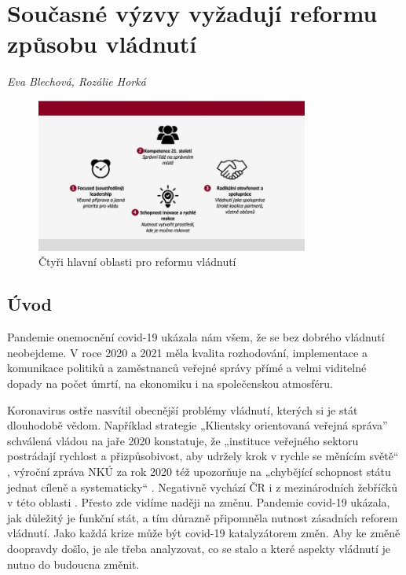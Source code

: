 
\chapter[Současné výzvy vyžadují reformu vládnutí]{Současné výzvy vyžadují reformu způsobu vládnutí}
\label{Nove_vyzvy}

\textit{Eva Blechová, Rozálie Horká}
\vspace{15mm}

\begin{figure}
    \centering
    \includegraphics[width=0.8\textwidth]{pic/evaschema.jpg}
    \caption{Čtyři hlavní oblasti pro reformu vládnutí}
    \label{fig:ctyrioblasti}
\end{figure}

\section*{Úvod} 

Pandemie onemocnění covid-19 ukázala nám všem, že se bez dobrého vládnutí neobejdeme. V roce 2020 a 2021 měla kvalita rozhodování, implementace a komunikace politiků a zaměstnanců veřejné správy přímé a velmi viditelné dopady na počet úmrtí, na ekonomiku i na společenskou atmosféru.

Koronavirus ostře nasvítil obecnější problémy vládnutí, kterých si je stát dlouhodobě vědom. Například strategie „Klientsky orientovaná veřejná správa” schválená vládou na jaře 2020 konstatuje, že „instituce veřejného sektoru postrádají rychlost a přizpůsobivost, aby udržely krok v rychle se měnícím světě“ \cite{ministerstvo_pro_mistni_rozvoj_cr_ministerstvo_2020}, výroční zpráva NKÚ za rok 2020 též upozorňuje na „chybějící schopnost státu jednat cíleně a systematicky“ \cite{nejvyssi-kontrolni-urad_vyrocni_2020}. Negativně vychází ČR i z mezinárodních žebříčků v této oblasti \cite{wef_global_2019}. Přesto zde vidíme naději na změnu. Pandemie covid-19 ukázala, jak důležitý je funkční stát, a tím důrazně připomněla nutnost zásadních reforem vládnutí. Jako každá krize může být covid-19 katalyzátorem změn. Aby ke změně doopravdy došlo, je ale třeba analyzovat, co se stalo a které aspekty vládnutí je nutno do budoucna změnit.


